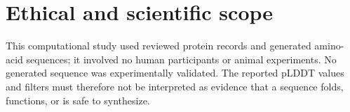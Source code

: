 \documentclass{article}
\begin{document}
\section{Ethical and scientific scope}

This computational study used reviewed protein records and generated amino-acid
sequences; it involved no human participants or animal experiments. No generated
sequence was experimentally validated. The reported pLDDT values and filters
must therefore not be interpreted as evidence that a sequence folds, functions,
or is safe to synthesize.
\end{document}
